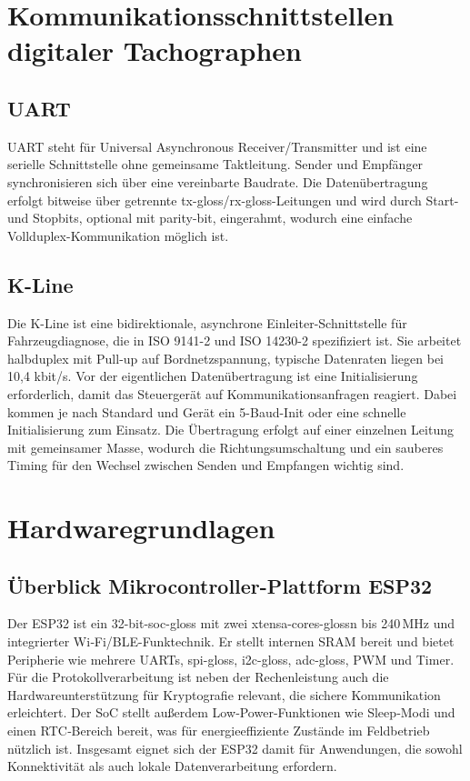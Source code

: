 \section{Kommunikationsschnittstellen digitaler Tachographen}
\subsection{UART}
UART steht für Universal Asynchronous Receiver/Transmitter und ist eine serielle Schnittstelle ohne gemeinsame Taktleitung. Sender und Empfänger synchronisieren sich über eine vereinbarte Baudrate. Die Datenübertragung erfolgt bitweise über getrennte \gls{tx-gloss}/\gls{rx-gloss}-Leitungen und wird durch Start- und Stopbits, optional mit \gls{parity-bit}, eingerahmt, wodurch eine einfache Vollduplex-Kommunikation möglich ist.\cite{microchip-pic24h-uart}

\subsection{K-Line}
Die K-Line ist eine bidirektionale, asynchrone Einleiter-Schnittstelle für Fahrzeugdiagnose, die in ISO 9141-2 und ISO 14230-2 spezifiziert ist. Sie arbeitet halbduplex mit Pull-up auf Bordnetzspannung, typische Datenraten liegen bei 10,4 kbit/s.\cite{iso-9141-2,iso-14230-2} Vor der eigentlichen Datenübertragung ist eine Initialisierung erforderlich, damit das Steuergerät auf Kommunikationsanfragen reagiert. Dabei kommen je nach Standard und Gerät ein 5-Baud-Init oder eine schnelle Initialisierung zum Einsatz. Die Übertragung erfolgt auf einer einzelnen Leitung mit gemeinsamer Masse, wodurch die Richtungsumschaltung und ein sauberes Timing für den Wechsel zwischen Senden und Empfangen wichtig sind.\cite{iso-9141-2,iso-14230-2}


\section{Hardwaregrundlagen}
\subsection{Überblick Mikrocontroller-Plattform ESP32}
Der ESP32 ist ein 32-bit-\gls{soc-gloss} mit zwei \gls{xtensa-cores-gloss}n bis 240\,MHz und integrierter Wi‑Fi/BLE-Funktechnik. Er stellt internen SRAM bereit und bietet Peripherie wie mehrere UARTs, \gls{spi-gloss}, \gls{i2c-gloss}, \gls{adc-gloss}, PWM und Timer. Für die Protokollverarbeitung ist neben der Rechenleistung auch die Hardwareunterstützung für Kryptografie relevant, die sichere Kommunikation erleichtert. Der SoC stellt außerdem Low‑Power‑Funktionen wie Sleep‑Modi und einen RTC‑Bereich bereit, was für energieeffiziente Zustände im Feldbetrieb nützlich ist. Insgesamt eignet sich der ESP32 damit für Anwendungen, die sowohl Konnektivität als auch lokale Datenverarbeitung erfordern.\cite{espressif-esp32}

